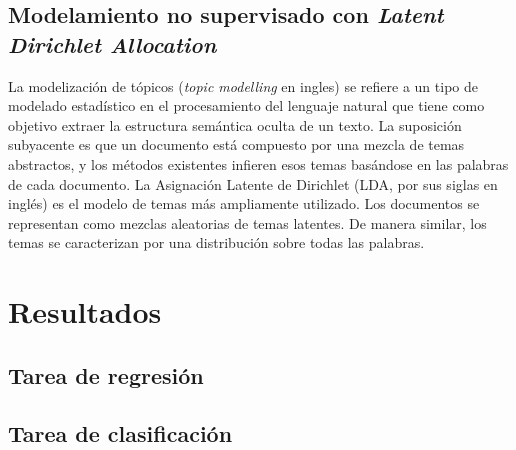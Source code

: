 \documentclass[
	spanish, %
	letterpaper, oneside
]{article}
\begin{document}
\subsection{Modelamiento no supervisado con \textit{Latent Dirichlet Allocation}}


La modelización de tópicos (\textit{topic modelling} en ingles) se refiere a un tipo de modelado estadístico en el procesamiento del lenguaje natural que tiene como objetivo extraer la estructura semántica oculta de un texto. La suposición subyacente es que un documento está compuesto por una mezcla de temas abstractos, y los métodos existentes infieren esos temas basándose en las palabras de cada documento. La Asignación Latente de Dirichlet (LDA, por sus siglas en inglés) es el modelo de temas más ampliamente utilizado. Los documentos se representan como mezclas aleatorias de temas latentes. De manera similar, los temas se caracterizan por una distribución sobre todas las palabras.




\section{Resultados}

\subsection{Tarea de regresión}

\lipsum[6]


\subsection{Tarea de clasificación}

\lipsum[7]
\end{document}
